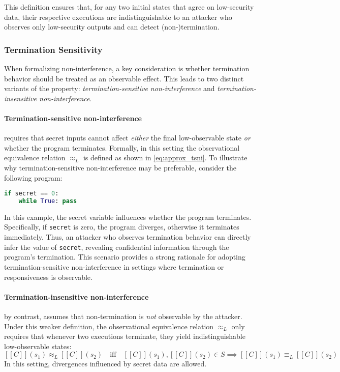 \documentclass[12pt,a4paper,twoside]{book}
\newcommand{\llbracket}{[\![}
\newcommand{\rrbracket}{]\!]}
\begin{document}
This definition ensures that, for any two initial states that agree on low-security data, their respective executions are indistinguishable to an attacker who observes only low-security outputs and can detect (non-)termination.

\subsubsection{Termination Sensitivity}
When formalizing non-interference, a key consideration is whether termination behavior should be treated as an observable effect\cite{hedin2012perspective}. This leads to two distinct variants of the property: \emph{termination-sensitive non-interference} and \emph{termination-insensitive non-interference}.

\paragraph{Termination-sensitive non-interference} requires that secret inputs cannot affect \emph{either} the final low-observable state \emph{or} whether the program terminates\cite{volpano1997eliminating}. Formally, in this setting the observational equivalence relation $\approx_L$ is defined as shown in \ref{eq:approx_tsni}. To illustrate why termination-sensitive non-interference may be preferable, consider the following program:
\begin{lstlisting}[language=Python]
if secret == 0:
    while True: pass
\end{lstlisting}
In this example, the secret variable influences whether the program terminates. Specifically, if \lstinline|secret| is zero, the program diverges, otherwise it terminates immediately. Thus, an attacker who observes termination behavior can directly infer the value of \lstinline|secret|, revealing confidential information through the program's termination. This scenario provides a strong rationale for adopting termination-sensitive non-interference in settings where termination or responsiveness is observable.

\paragraph{Termination-insensitive non-interference} by contrast, assumes that non-termination is \emph{not} observable by the attacker\cite{goguen1982security}. 
Under this weaker definition, the observational equivalence relation $\approx_L$ only requires that whenever two executions terminate, they yield indistinguishable low-observable states\cite{volpano1996sound}:
\[
\llbracket C \rrbracket(s_1) \approx_L \llbracket C \rrbracket(s_2)
\quad\text{iff}\quad
\llbracket C \rrbracket(s_1), \llbracket C \rrbracket(s_2) \in S \implies
\llbracket C \rrbracket(s_1) \equiv_L \llbracket C \rrbracket(s_2)
\]
In this setting, divergences influenced by secret data are allowed.
\end{document}
